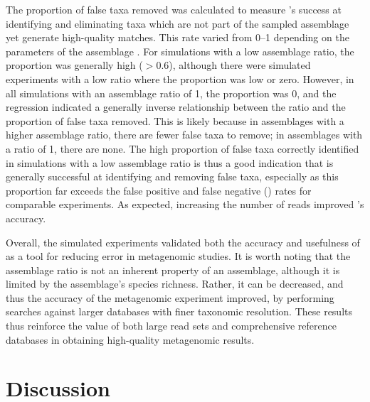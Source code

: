 The proportion of false taxa removed was calculated to measure 's success at identifying and eliminating taxa which are not part of the sampled assemblage yet generate high-quality  matches.
This rate varied from 0--1 depending on the parameters of the assemblage .
For simulations with a low assemblage ratio, the proportion was generally high ($> 0.6$), although there were simulated experiments with a low ratio where the proportion was low or zero.
However, in all simulations with an assemblage ratio of 1, the proportion was 0, and the regression indicated a generally inverse relationship between the ratio and the proportion of false taxa removed.
This is likely because in assemblages with a higher assemblage ratio, there are fewer false taxa to remove; in assemblages with a ratio of 1, there are none.
The high proportion of false taxa correctly identified in simulations with a low assemblage ratio is thus a good indication that  is generally successful at identifying and removing false taxa, especially as this proportion far exceeds the false positive and false negative () rates for comparable experiments.
As expected, increasing the number of reads improved 's accuracy.

Overall, the simulated experiments validated both the accuracy and usefulness of  as a tool for reducing error in metagenomic studies.
It is worth noting that the assemblage ratio is not an inherent property of an assemblage, although it is limited by the assemblage's species richness.
Rather, it can be decreased, and thus the accuracy of the metagenomic experiment improved, by performing  searches against larger databases with finer taxonomic resolution.
These results thus reinforce the value of both large read sets and comprehensive reference databases in obtaining high-quality metagenomic results.

\section{Discussion}

